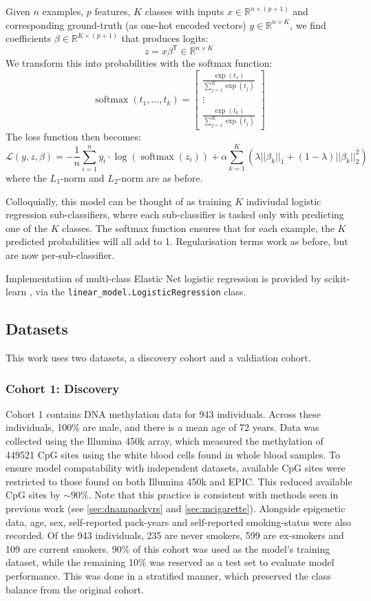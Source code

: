 \documentclass{article}
\DeclareMathOperator*{\softmax}{softmax}
\begin{document}
Given \(n\) examples, \(p\) features, \(K\) classes with inputs \(x \in \mathbb{R}^{n \times (p + 1)}\) and corresponding ground-truth (as one-hot encoded vectors) \(y \in \mathbb{R}^{n \times K}\), we find coefficients \(\beta \in \mathbb{R}^{K \times (p + 1)}\) that produces logits:
\[z = x \beta^\mathsf{T} \in \mathbb{R}^{n \times K}\]
We transform this into probabilities with the softmax function:
\[\softmax(t_1,... , t_k) =
    \begin{bmatrix}
        \frac{\exp(t_1)}{\sum_{j=1}^{K} \exp(t_j)} \\
        \vdots                                     \\
        \frac{\exp(t_k)}{\sum_{j=1}^{K} \exp(t_j)}
    \end{bmatrix}
\]
The loss function then becomes:
\[\mathcal{L}(y, z, \beta) = -\frac{1}{n}\sum_{i=1}^{n} y_i \cdot \log(\softmax(z_i)) + \alpha\sum_{k=1}^{K}(\lambda||\beta_k||_1 + (1 - \lambda)||\beta_k||_2^2)\]
where the \(L_1\)-norm and \(L_2\)-norm are as before.

Colloquially, this model can be thought of as training \(K\) indiviudal logistic regression sub-classifiers, where each sub-classifier is tasked only with predicting one of the \(K\) classes. The softmax function ensures that for each example, the \(K\) predicted probabilities will all add to 1. Regularisation terms work as before, but are now per-sub-classifier.

Implementation of multi-class Elastic Net logistic regression is provided by scikit-learn \cite{scikit-learn}, via the \verb|linear_model.LogisticRegression| class.

\subsection{Datasets}
This work uses two datasets, a discovery cohort and a valdiation cohort.

\subsubsection{Cohort 1: Discovery}
Cohort 1 contains DNA methylation data for 943 individuals. Across these individuals, 100\% are male, and there is a mean age of 72 years. Data was collected using the Illumina 450k array, which measured the methylation of \num{449521} CpG sites using the white blood cells found in whole blood samples. To ensure model compatability with independent datasets, available CpG sites were restricted to those found on both Illumina 450k and EPIC. This reduced available CpG sites by \(\sim\!90\%\). Note that this practice is consistent with methods seen in previous work (see \ref{sec:dnampackyrs} and \ref{sec:mcigarette}). Alongside epigenetic data, age, sex, self-reported pack-years and self-reported smoking-status were also recorded. Of the 943 individuals, 235 are never smokers, 599 are ex-smokers and 109 are current smokers. 90\% of this cohort was used as the model's training dataset, while the remaining 10\% was reserved as a test set to evaluate model performance. This was done in a stratified manner, which preserved the class balance from the original cohort.
\end{document}
